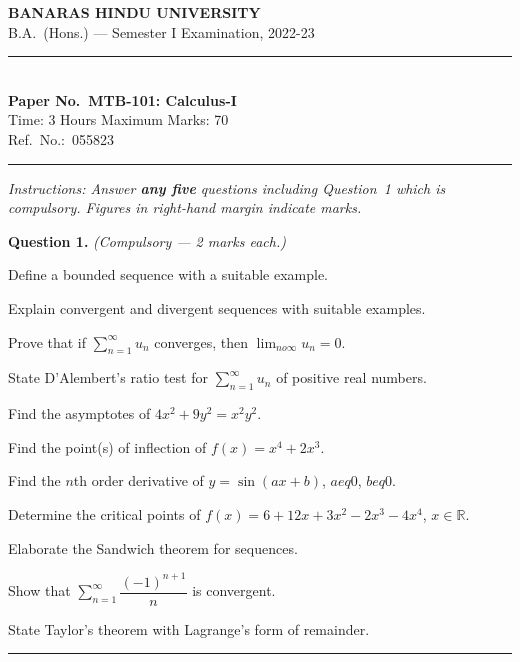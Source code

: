 \documentclass[11pt,a4paper]{article}
\begin{document}
\begin{center}
  {\large\bfseries BANARAS HINDU UNIVERSITY}\\[2pt]
  {\normalsize B.A.\ (Hons.) --- Semester I Examination, 2022-23}\\[6pt]
  \rule{0.8\linewidth}{0.5pt}\\[6pt]
  {\large\bfseries Paper No.\ MTB-101: Calculus-I}\\[4pt]
  {\normalsize Time: 3 Hours \hfill Maximum Marks: 70}\\[2pt]
  {\small Ref.\ No.:\ 055823}
\end{center}
\rule{\linewidth}{0.4pt}
\smallskip



\noindent   \textit{Instructions: Answer   \textbf{any five} questions including Question~1 which is compulsory. Figures in right-hand margin indicate marks.}
\bigskip




\noindent   \textbf{Question 1.}   \textit{(Compulsory --- 2 marks each.)}

\begin{parts}
  \item Define a bounded sequence with a suitable example.
  \item Explain convergent and divergent sequences with suitable examples.
  \item Prove that if $\displaystyle\sum_{n=1}^{\infty}u_n$ converges, then $\lim_{n o\infty}u_n=0$.
  \item State D'Alembert's ratio test for $\displaystyle\sum_{n=1}^{\infty}u_n$ of positive real numbers.
  \item Find the asymptotes of $4x^2+9y^2=x^2y^2$.
  \item Find the point(s) of inflection of $f(x)=x^4+2x^3$.
  \item Find the $n$th order derivative of $y=\sin(ax+b)$, $a
eq0$, $b
eq0$.
  \item Determine the critical points of $f(x)=6+12x+3x^2-2x^3-4x^4$, $x\in\mathbb{R}$.
  \item Elaborate the Sandwich theorem for sequences.
  \item Show that $\displaystyle\sum_{n=1}^{\infty}\dfrac{(-1)^{n+1}}{n}$ is convergent.
  \item State Taylor's theorem with Lagrange's form of remainder.
\end{parts}
\medskip\rule{\linewidth}{0.2pt}

\medskip
\end{document}
